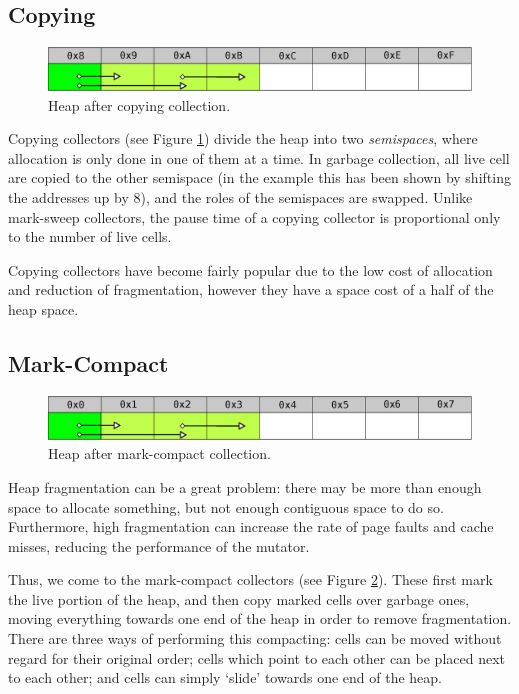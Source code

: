 \subsection{Copying}
\label{sec:lit-gc-copying}

\begin{figure}[t]
  \centering
  \includegraphics[width=\textwidth]{lit-gc-copying}
  \caption{Heap after copying collection.}
  \label{fig:lit-gc-copying}
\end{figure}

Copying collectors (see Figure \ref{fig:lit-gc-copying}) divide the
heap into two \textit{semispaces}, where allocation is only done in
one of them at a time. In garbage collection, all live cell are copied
to the other semispace (in the example this has been shown by shifting
the addresses up by 8), and the roles of the semispaces are
swapped\cite{Fenichel69}. Unlike mark-sweep collectors, the pause time
of a copying collector is proportional only to the number of live
cells\cite{Appel87}.

Copying collectors have become fairly popular due to the low cost of
allocation and reduction of fragmentation, however they have a space
cost of a half of the heap space\cite{GarbageCollection}.

\subsection{Mark-Compact}
\label{sec:lit-gc-markcompact}

\begin{figure}[t]
  \centering
  \includegraphics[width=\textwidth]{lit-gc-markcompact}
  \caption{Heap after mark-compact collection.}
  \label{fig:lit-gc-markcompact}
\end{figure}

Heap fragmentation can be a great problem: there may be more than
enough space to allocate something, but not enough contiguous space to
do so. Furthermore, high fragmentation can increase the rate of page
faults and cache misses, reducing the performance of the
mutator\cite{Zorn90}.

Thus, we come to the mark-compact collectors (see Figure
\ref{fig:lit-gc-markcompact}). These first mark the live portion of
the heap, and then copy marked cells over garbage ones, moving
everything towards one end of the heap in order to remove
fragmentation\cite{GarbageCollection}. There are three ways of
performing this compacting: cells can be moved without regard for
their original order; cells which point to each other can be placed
next to each other; and cells can simply `slide' towards one end of
the heap\cite{Cohen81}.

